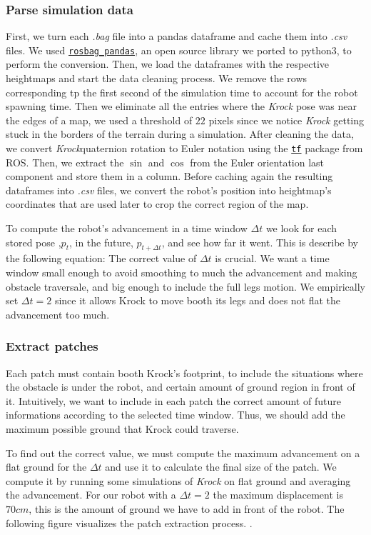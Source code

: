 \documentclass[../document.tex]{subfiles}
\begin{document}
\subsubsection{Parse simulation data}
First, we turn each \emph{.bag} file into a pandas dataframe and cache them into \emph{.csv} files. We used \href{https://github.com/aktaylor08/RosbagPandas}{\texttt{rosbag\_pandas}}, an open source library we ported to python3, to perform the conversion.
Then, we load the dataframes with the respective heightmaps and start the data cleaning process. We remove the rows corresponding tp the first second of the simulation time to account for the robot spawning time. Then we eliminate all the entries where the \emph{Krock} pose was near the edges of a map, we used a threshold of $22$ pixels since we notice  \emph{Krock} getting stuck in the borders of the terrain during a simulation. 
After cleaning the data, we convert \emph{Krock}quaternion rotation to Euler notation using the \href{https://duckduckgo.com/?q=ros+tf&atb=v154-1__&ia=web}{\texttt{tf}} package from ROS. Then, we extract the $\sin$ and $\cos$ from the Euler orientation last component and store them in a column.
Before caching again the resulting dataframes into \emph{.csv} files, we convert the robot's position into heightmap's coordinates that are used later to crop the correct region of the map.

To compute the robot's advancement in a time window $\Delta t$ we look for each stored pose ,$p_t$, in the future, $p_{t + \Delta t}$, and see how far it went. This is describe by the following equation: 
The correct value of $\Delta t$ is crucial. We want a time window small enough to avoid smoothing to much the advancement and making obstacle traversale, and big enough to include the full legs motion. We empirically set $\Delta t = 2$ since it allows Krock to move booth its legs and does not flat the advancement too much. 
\subsubsection{Extract patches}
Each patch must contain booth Krock's footprint, to include the situations where the obstacle is under the robot, and certain amount of ground region in front of it. Intuitively, we want to include in each patch the correct amount of future informations according to the selected time window. Thus, we should add the maximum possible ground that Krock could traverse. 

To find out the correct value, we must compute the maximum advancement on a flat ground for the $\Delta t$ and use it to calculate the final size of the patch. We compute it by running some simulations of \emph{Krock} on flat ground and averaging the advancement. For our robot with a $\Delta t = 2$ the maximum displacement is $70cm$, this is the amount of ground we have to add in front of the robot. The following figure visualizes the patch extraction process. 
. 
\end{document}

